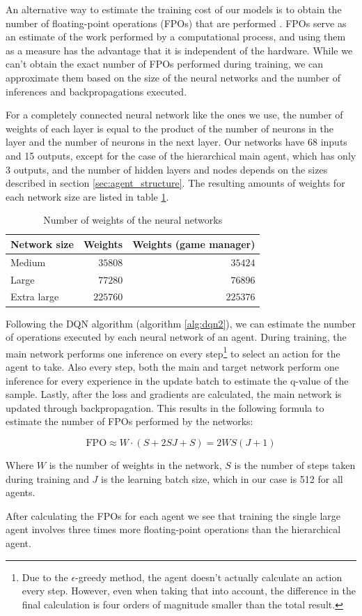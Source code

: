 An alternative way to estimate the training cost of our models is to obtain the number of floating-point operations (FPOs) that are performed \cite{Schwartz:2019}. FPOs serve as an estimate of the work performed by a computational process, and using them as a measure has the advantage that it is independent of the hardware. While we can't obtain the exact number of FPOs performed during training, we can approximate them based on the size of the neural networks and the number of inferences and backpropagations executed.

For a completely connected neural network like the ones we use, the number of weights of each layer is equal to the product of the number of neurons in the layer and the number of neurons in the next layer. Our networks have 68 inputs and 15 outputs, except for the case of the hierarchical main agent, which has only 3 outputs, and the number of hidden layers and nodes depends on the sizes described in section \ref{sec:agent_structure}. The resulting amounts of weights for each network size are listed in table \ref{tab:weights}.

\begin{table}[h]
    \centering
    \begin{tabular}{ l|r r }
        Network size & Weights & Weights (game manager) \\
        \hline
        Medium & $35808$ & $35424$ \\
        Large & $77280$ & $76896$ \\
        Extra large & $225760$ & $225376$ \\
    \end{tabular}
    \caption{Number of weights of the neural networks}
    \label{tab:weights}
\end{table}

Following the DQN algorithm (algorithm \ref{alg:dqn2}), we can estimate the number of operations executed by each neural network of an agent. During training, the main network performs one inference on every step\footnote{Due to the $\epsilon$-greedy method, the agent doesn't actually calculate an action every step. However, even when taking that into account, the difference in the final calculation is four orders of magnitude smaller than the total result.} to select an action for the agent to take. Also every step, both the main and target network perform one inference for every experience in the update batch to estimate the q-value of the sample. Lastly, after the loss and gradients are calculated, the main network is updated through backpropagation. This results in the following formula to estimate the number of FPOs performed by the networks:

\begin{equation}
    \mathrm{FPO} \approx W \cdot (S + 2SJ + S) = 2WS(J+1)
\end{equation}

Where $W$ is the number of weights in the network, $S$ is the number of steps taken during training and $J$ is the learning batch size, which in our case is 512 for all agents.

After calculating the FPOs for each agent we see that training the single large agent involves three times more floating-point operations than the hierarchical agent.